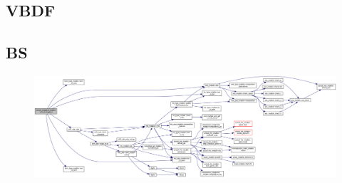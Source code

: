 \subsection{VBDF}
\label{sec:VBDF}

\subsection{BS}
\label{sec:BS}


\begin{figure}
\centering
\includegraphics[width=\linewidth]{doxygen_network}
\end{figure}
